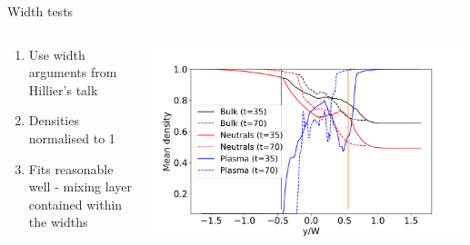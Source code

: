 \documentclass[10pt,aspectratio=169,usenames,dvipsnames]{beamer}
\begin{document}
\begin{frame}{Width tests}
\begin{columns}
\begin{column}{0.5\textwidth}
\begin{enumerate}
\item Use width arguments from Hillier's talk
\item Densities normalised to 1
\item Fits reasonable well - mixing layer contained within the widths
\end{enumerate}
\end{column}
\begin{column}{0.5\textwidth}
\includegraphics[width=0.99\textwidth]{2023Mixing/Figures/KHInlev_widthtest.png}
\end{column}
\end{columns}
\end{frame}
\end{document}
